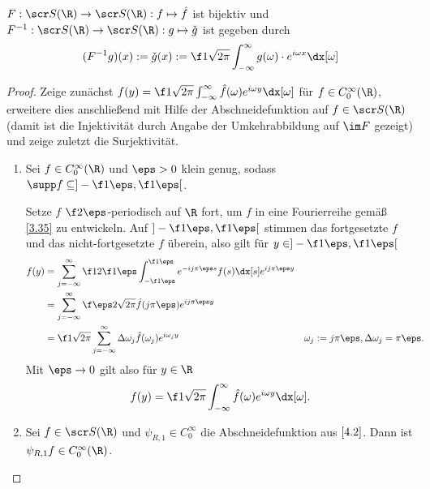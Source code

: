 \begin{st} \label{4.10}
	$F: \scr S(\R) \to \scr S(\R): f \mapsto \hat f$ ist bijektiv und $F^{-1}: \scr S(\R) \to \scr S(\R) : g \mapsto \check g$ ist gegeben durch
	\[
		(F^{-1}g)(x) := \check g(x) := \f 1{\sqrt{2\pi}} \int_{-\infty}^\infty g(\omega) \cdot e^{i \omega x} \dx[\omega]
	\]
	\begin{proof}
		Zeige zunächst $f(y) = \f 1{\sqrt{2\pi}} \int_{-\infty}^\infty \hat f(\omega) e^{i\omega y} \dx[\omega]$ für $f \in C_0^\infty(\R)$, erweitere dies anschließend mit Hilfe der Abschneidefunktion auf $f \in \scr S(\R)$ (damit ist die Injektivität durch Angabe der Umkehrabbildung auf $\im F$ gezeigt) und zeige zuletzt die Surjektivität.
		\begin{enumerate}[1)]
			\item
				Sei $f \in C_0^\infty(\R)$ und $\eps > 0$ klein genug, sodass $\supp f \subset ]-\f 1\eps, \f 1\eps[$.

				Setze $f$ $\f 2\eps$-periodisch auf $\R$ fort, um $f$ in eine Fourierreihe gemäß \ref{3.35} zu entwickeln.
				Auf $]-\f 1\eps, \f 1\eps[$ stimmen das fortgesetzte $f$ und das nicht-fortgesetzte $f$ überein, also gilt für $y \in ]-\f 1\eps, \f 1\eps[$
				\begin{align*}
					f(y)
					&= \sum_{j=-\infty}^\infty \f 1{2 \f 1\eps} \int_{-\f 1\eps}^{\f 1\eps} e^{-ij\pi \eps s} f(s) \dx[s] e^{ij\pi \eps y} \\
					&= \sum_{j=-\infty}^\infty \f \eps 2 \sqrt{2\pi} \hat f(j\pi \eps) e^{ij\pi \eps y} \\
					&= \f 1{\sqrt{2\pi}} \sum_{j=-\infty}^\infty \Delta \omega_j \hat f(\omega_j) e^{i \omega_j y}
						&& \omega_j := j \pi \eps, \Delta \omega_j = \pi \eps.
				\end{align*}
				Mit $\eps \to 0$ gilt also für $y \in \R$
				\[
					f(y) = \f 1{\sqrt{2\pi}} \int_{-\infty}^\infty \hat f(\omega) e^{i \omega y} \dx[\omega].
				\]

			\item
				Sei $f \in \scr S(\R)$ und $\psi_{R,1} \in C_0^\infty$ die Abschneidefunktion aus $\ref{4.2}$.
				Dann ist $\psi_{R,1} f \in C_0^\infty(\R)$.


\end{enumerate}
\end{proof}
\end{st}
